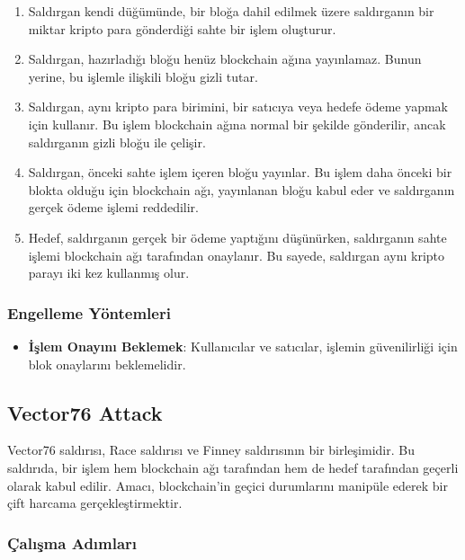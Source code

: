 \begin{enumerate}
    \item Saldırgan kendi düğümünde, bir bloğa dahil edilmek üzere saldırganın bir miktar kripto para gönderdiği sahte bir işlem oluşturur.
    \item Saldırgan, hazırladığı bloğu henüz blockchain ağına yayınlamaz. Bunun yerine, bu işlemle ilişkili bloğu gizli tutar.
    \item Saldırgan, aynı kripto para birimini, bir satıcıya veya hedefe ödeme yapmak için kullanır. Bu işlem blockchain ağına normal bir şekilde gönderilir, ancak saldırganın gizli bloğu ile çelişir.
    \item Saldırgan, önceki sahte işlem içeren bloğu yayınlar. Bu işlem daha önceki bir blokta olduğu için blockchain ağı, yayınlanan bloğu kabul eder ve saldırganın gerçek ödeme işlemi reddedilir.
    \item Hedef, saldırganın gerçek bir ödeme yaptığını düşünürken, saldırganın sahte işlemi blockchain ağı tarafından onaylanır. Bu sayede, saldırgan aynı kripto parayı iki kez kullanmış olur.
\end{enumerate}

\subsubsection{Engelleme Yöntemleri}

\begin{itemize}
    \item \textbf{İşlem Onayını Beklemek}: Kullanıcılar ve satıcılar, işlemin güvenilirliği için blok onaylarını beklemelidir.
\end{itemize}

\newpage

\subsection{Vector76 Attack}

Vector76 saldırısı, Race saldırısı ve Finney saldırısının bir birleşimidir. Bu saldırıda, bir işlem hem blockchain ağı tarafından hem de hedef tarafından geçerli olarak kabul edilir. Amacı, blockchain'in geçici durumlarını manipüle ederek bir çift harcama gerçekleştirmektir.

\subsubsection{Çalışma Adımları}

